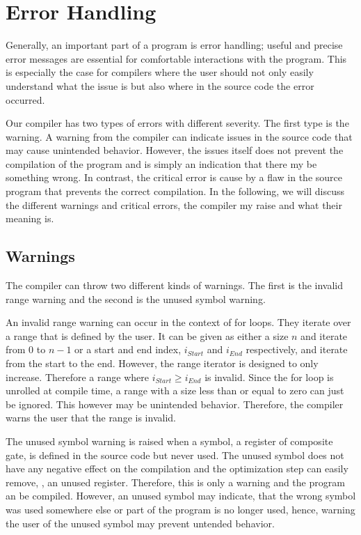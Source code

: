 \section{Error Handling}
Generally, an important part of a program is error handling; useful and precise error messages are essential for comfortable interactions with the program. This is especially the case for compilers where the user should not only easily understand what the issue is but also where in the source code the error occurred.  

Our compiler has two types of errors with different severity. The first type is the warning. A warning from the compiler can indicate issues in the source code that may cause unintended behavior. However, the issues itself does not prevent the compilation of the program and is simply an indication that there my be something wrong. In contrast, the critical error is cause by a flaw in the source program that prevents the correct compilation. In the following, we will discuss the different warnings and critical errors, the compiler my raise and what their meaning is.

\subsection{Warnings}
The compiler can throw two different kinds of warnings. The first is the invalid range warning and the second is the unused symbol warning.

An invalid range warning can occur in the context of for loops. They iterate over a range that is defined by the user. It can be given as either a size $n$ and iterate from $0$ to $n-1$ or a start and end index, $i_{Start}$ and $i_{End}$ respectively, and iterate from the start to the end. However, the range iterator is designed to only increase. Therefore a range where $i_{Start} \geq i_{End}$ is invalid. Since the for loop is unrolled at compile time, a range with a size less than or equal to zero can just be ignored. This however may be unintended behavior. Therefore, the compiler warns the user that the range is invalid.

The unused symbol warning is raised when a symbol, \eg a register of composite gate, is defined in the source code but never used. The unused symbol does not have any negative effect on the compilation and the optimization step can easily remove, \eg, an unused register. Therefore, this is only a warning and the program an be compiled. However, an unused symbol may indicate, that the wrong symbol was used somewhere else or part of the program is no longer used, hence, warning the user of the unused symbol may prevent untended behavior.

